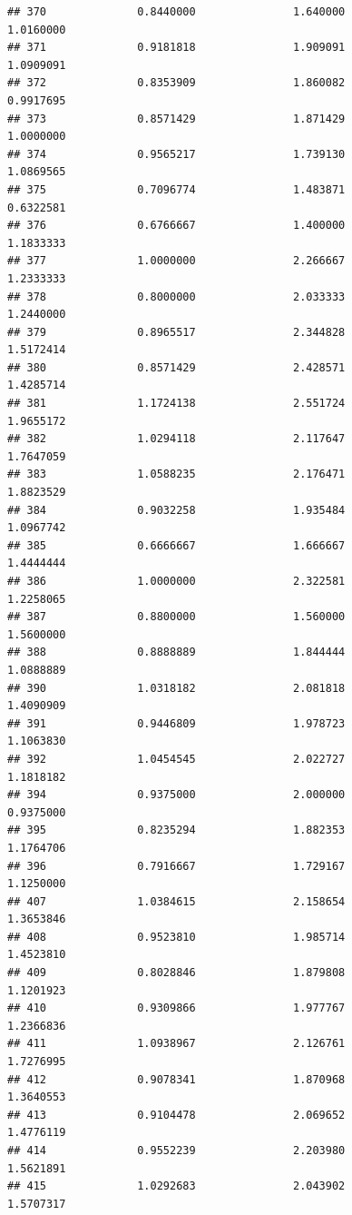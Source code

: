 \documentclass[]{article}
\begin{document}
\begin{verbatim}
## 370              0.8440000               1.640000                1.0160000
## 371              0.9181818               1.909091                1.0909091
## 372              0.8353909               1.860082                0.9917695
## 373              0.8571429               1.871429                1.0000000
## 374              0.9565217               1.739130                1.0869565
## 375              0.7096774               1.483871                0.6322581
## 376              0.6766667               1.400000                1.1833333
## 377              1.0000000               2.266667                1.2333333
## 378              0.8000000               2.033333                1.2440000
## 379              0.8965517               2.344828                1.5172414
## 380              0.8571429               2.428571                1.4285714
## 381              1.1724138               2.551724                1.9655172
## 382              1.0294118               2.117647                1.7647059
## 383              1.0588235               2.176471                1.8823529
## 384              0.9032258               1.935484                1.0967742
## 385              0.6666667               1.666667                1.4444444
## 386              1.0000000               2.322581                1.2258065
## 387              0.8800000               1.560000                1.5600000
## 388              0.8888889               1.844444                1.0888889
## 390              1.0318182               2.081818                1.4090909
## 391              0.9446809               1.978723                1.1063830
## 392              1.0454545               2.022727                1.1818182
## 394              0.9375000               2.000000                0.9375000
## 395              0.8235294               1.882353                1.1764706
## 396              0.7916667               1.729167                1.1250000
## 407              1.0384615               2.158654                1.3653846
## 408              0.9523810               1.985714                1.4523810
## 409              0.8028846               1.879808                1.1201923
## 410              0.9309866               1.977767                1.2366836
## 411              1.0938967               2.126761                1.7276995
## 412              0.9078341               1.870968                1.3640553
## 413              0.9104478               2.069652                1.4776119
## 414              0.9552239               2.203980                1.5621891
## 415              1.0292683               2.043902                1.5707317

\end{verbatim}
\end{document}

